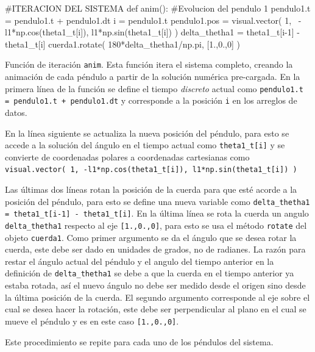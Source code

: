 \begin{listing}[style=python, numbers = none]
#ITERACION DEL SISTEMA
def anim(): 
    #Evolucion del pendulo 1
    pendulo1.t = pendulo1.t + pendulo1.dt
    i = pendulo1.t
    pendulo1.pos = visual.vector( 1, \
    -l1*np.cos(theta1_t[i]), l1*np.sin(theta1_t[i]) )
    delta_thetha1 = theta1_t[i-1] - theta1_t[i]
    cuerda1.rotate( 180*delta_thetha1/np.pi, [1.,0.,0] )
\end{listing}
Función de iteración \texttt{anim}. Esta función itera el sistema completo,
creando la animación de cada péndulo a partir de la solución numérica 
pre-cargada. En la primera línea de la función se define el tiempo 
\textit{discreto} actual como \texttt{pendulo1.t = pendulo1.t + pendulo1.dt}
y corresponde a la posición \texttt{i} en los arreglos de datos. 


En la línea siguiente se actualiza la nueva posición del péndulo, para esto
se accede a la solución del ángulo en el tiempo actual como 
\texttt{theta1\_t[i]} y se convierte de coordenadas polares a coordenadas
cartesianas como \texttt{visual.vector( 1, -l1*np.cos(theta1\_t[i]), 
l1*np.sin(theta1\_t[i]) )}


Las últimas dos líneas rotan la posición de la cuerda para que esté acorde
a la posición del péndulo, para esto se define una nueva variable como
\texttt{delta\_thetha1 = theta1\_t[i-1] - theta1\_t[i]}. En la última línea
se rota la cuerda un angulo \texttt{delta\_thetha1} respecto al eje 
\texttt{[1.,0.,0]}, para esto se usa el método \texttt{rotate} del objeto 
\texttt{cuerda1}. Como primer argumento se da el ángulo que se desea rotar 
la cuerda, este debe ser dado en unidades de grados, no de radianes. La 
razón para restar el ángulo actual del péndulo y el angulo del tiempo anterior 
en la definición de \texttt{delta\_thetha1} se debe a que la cuerda en el 
tiempo anterior ya estaba rotada, así el nuevo ángulo no debe ser medido 
desde el origen sino desde la última posición de la cuerda. El segundo 
argumento corresponde al eje sobre el cual se desea hacer la rotación, este 
debe ser perpendicular al plano en el cual se mueve el péndulo y es en 
este caso \texttt{[1.,0.,0]}.


Este procedimiento se repite para cada uno de los péndulos del sistema.


